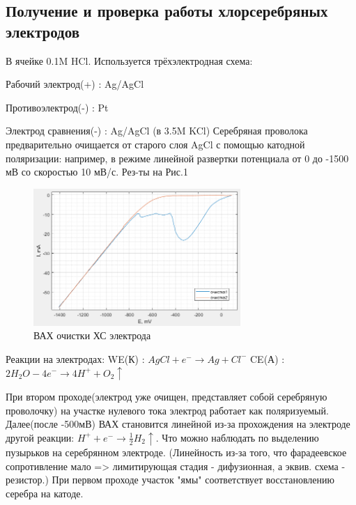 \documentclass[a4paper, 12pt]{article}
\begin{document}
\subsection{Получение и проверка работы хлорсеребряных электродов}

В ячейке 0.1M HCl. Используется трёхэлектродная схема:

Рабочий электрод(+) : Ag/AgCl  

Противоэлектрод(-) : Pt  

Электрод сравнения(-) : Ag/AgCl (в 3.5M KCl) \newline
Серебряная проволока предварительно очищается от старого слоя AgCl с помощью катодной поляризации: например, в режиме линейной развертки потенциала от 0 до -1500 мВ со скоростью 10 мВ/с. Рез-ты на Рис.1

\begin{figure}[h!]
    \begin{center}
    \includegraphics[width=0.7\textwidth]{1 очистка.png}
    \end{center}
    \caption{ВАХ очистки ХС электрода}
\end{figure}

Реакции на электродах: \newline
WE(К) : $AgCl + e^- \rightarrow Ag + Cl^-$ \newline
CE(А) : $2H_{2}O - 4e^- \rightarrow 4H^+ + O_2 \uparrow$

При втором проходе(электрод уже очищен, представляет собой серебряную проволочку) на участке нулевого тока электрод работает как поляризуемый. Далее(после -500мВ) ВАХ становится линейной из-за прохождения на электроде другой реакции: $H^+ + e^- \rightarrow \frac{1}{2} H_2 \uparrow$. Что можно наблюдать по выделению пузырьков на серебрянном электроде. (Линейность из-за того, что фарадеевское сопротивление мало => лимитирующая стадия - дифузионная, а эквив. схема - резистор.) При первом проходе участок "ямы" соответствует восстановлению серебра на катоде.
\end{document}
